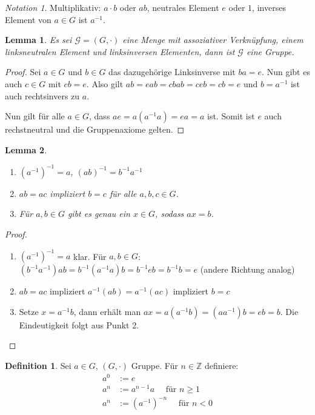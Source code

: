 \documentclass[12pt]{scrartcl} %
\newcommand{\inv}[1]{\left(#1\right)^{-1}}
\newcommand{\Inv}[1]{#1^{-1}}
\newtheorem{lemma}{Lemma}
\theoremstyle{definition}
\newtheorem*{defn}{Definition}
\theoremstyle{remark}
\newtheorem*{notation}{Notation}
\begin{document}
\begin{notation}
	Multiplikativ: $a\cdot b$ oder $ab$, neutrales Element $e$ oder $1$, inverses Element von $a\in G$ ist $\Inv a$.
\end{notation}

\begin{lemma}
	Es sei $\mathcal{G}=(G,\cdot)$ eine Menge mit assoziativer Verknüpfung, einem linksneutralen Element und linksinversen Elementen, dann ist $\mathcal{G}$ eine Gruppe.
\end{lemma}

\begin{proof}
	Sei $a\in G$ und $b\in G$ das dazugehörige Linksinverse mit $ba=e$.
	Nun gibt es auch $c\in G$ mit $cb=e$.
	Also gilt $ab=eab=cbab=ceb=cb=e$ und \(b = a^{-1}\) ist auch rechtsinvers zu \(a\).

	Nun gilt für alle $a\in G$, dass $ae=a(\Inv aa)=ea=a$ ist.
	Somit ist \(e\) auch rechstneutral und die Gruppenaxiome gelten.
\end{proof}

\begin{lemma}
	\begin{enumerate}
	\item $\inv{\Inv{a}}=a$, $\inv{ab}=\Inv b\Inv a$ %
	\item $ab=ac$ impliziert $b=c$ für alle $a,b,c\in G$.
	\item Für $a,b\in G$ gibt es genau ein $x\in G$, sodass $ax=b$.
	\end{enumerate}
\end{lemma}

\begin{proof}
	\begin{enumerate}
	\item $\inv{\Inv a}=a$ klar. Für $a,b\in G$: $(\Inv b\Inv a)ab=\Inv b(\Inv aa)b=\Inv beb=\Inv bb=e$ (andere Richtung analog) %
	\item $ab=ac$ impliziert $\Inv a(ab)=\Inv a(ac)$ impliziert $b=c$
	\item Setze $x=\Inv ab$, dann erhält man $ax=a(\Inv ab)=(a\Inv a)b=eb=b$.
		Die Eindeutigkeit folgt aus Punkt 2. \qedhere
	\end{enumerate}
\end{proof}

\begin{defn}
	Sei $a\in G$, $(G,\cdot)$ Gruppe.
	Für $n\in \mathbb{Z}$ definiere:
	\begin{align*}
		a^0 &:= e\\
		a^n &:= a^{n-1}a \quad \text{ für \(n\geq 1\)}\\
		a^n &:= \left(\Inv a\right)^{-n} \quad \text{ für \(n < 0\)}
	\end{align*}
\end{defn}
\end{document}
